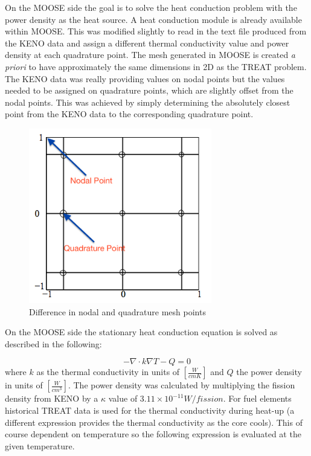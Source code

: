 \documentclass[11pt]{article}
\begin{document}
	On the MOOSE side the goal is to solve the heat conduction problem with the power density as the heat source. A heat conduction module is already available within MOOSE.  This was modified slightly to read in the text file produced from the KENO data and assign a different thermal conductivity value and power density at each quadrature point.  The mesh generated in MOOSE is created \emph{a priori} to have approximately the same dimensions in 2D as the TREAT problem.  The KENO data was really providing values on nodal points but the values needed to be assigned on quadrature points, which are slightly offset from the nodal points.  This was achieved by simply determining the absolutely closest point from the KENO data to the corresponding quadrature point. 
	
\begin{figure}[h]
    \centering
    \includegraphics[width=8cm]{figures/nodalvsquad.png}
    \caption{Difference in nodal and quadrature mesh points}
    \label{fig:nodalquad}
\end{figure}

On the MOOSE side the stationary heat conduction equation is solved as described in the following:

\begin{equation}
    -\nabla \cdot k\nabla T - Q = 0
\end{equation}
where $k$ as the thermal conductivity in units of $[\frac{W}{cm K}]$  and $Q$ the power density in units of $[\frac{W}{cm^3}]$. The power density was calculated by multiplying the fission density from KENO by a $\kappa$ value of $3.11 \times 10^{-11} W/fission$. For fuel elements historical TREAT data is used for the thermal conductivity during heat-up (a different expression provides the thermal conductivity as the core cools).  This of course dependent on temperature so the following expression is evaluated at the given temperature.
\end{document}
